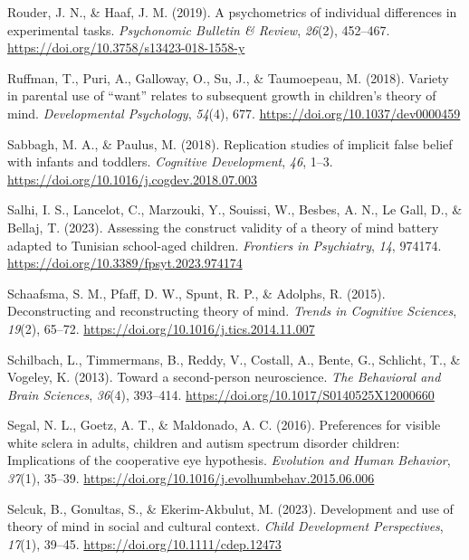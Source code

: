 \documentclass[
]{scrbook}
\newlength{\cslhangindent}
\newenvironment{CSLReferences}[2] %
 {\begin{list}{}{%
  \setlength{\itemindent}{0pt}
  \setlength{\leftmargin}{0pt}
  \setlength{\parsep}{0pt}
  \ifodd #1
   \setlength{\leftmargin}{\cslhangindent}
   \setlength{\itemindent}{-1\cslhangindent}
  \fi
  \setlength{\itemsep}{#2\baselineskip}}}
 {\end{list}}
\begin{document}
\begin{CSLReferences}{1}{0}
Rouder, J. N., \& Haaf, J. M. (2019). A psychometrics of individual differences in experimental tasks. \emph{Psychonomic Bulletin \& Review}, \emph{26}(2), 452--467. \url{https://doi.org/10.3758/s13423-018-1558-y}

Ruffman, T., Puri, A., Galloway, O., Su, J., \& Taumoepeau, M. (2018). Variety in parental use of {``want''} relates to subsequent growth in children's theory of mind. \emph{Developmental Psychology}, \emph{54}(4), 677. \url{https://doi.org/10.1037/dev0000459}

Sabbagh, M. A., \& Paulus, M. (2018). Replication studies of implicit false belief with infants and toddlers. \emph{Cognitive Development}, \emph{46}, 1--3. \url{https://doi.org/10.1016/j.cogdev.2018.07.003}

Salhi, I. S., Lancelot, C., Marzouki, Y., Souissi, W., Besbes, A. N., Le Gall, D., \& Bellaj, T. (2023). Assessing the construct validity of a theory of mind battery adapted to {Tunisian} school-aged children. \emph{Frontiers in Psychiatry}, \emph{14}, 974174. \url{https://doi.org/10.3389/fpsyt.2023.974174}

Schaafsma, S. M., Pfaff, D. W., Spunt, R. P., \& Adolphs, R. (2015). Deconstructing and reconstructing theory of mind. \emph{Trends in Cognitive Sciences}, \emph{19}(2), 65--72. \url{https://doi.org/10.1016/j.tics.2014.11.007}

Schilbach, L., Timmermans, B., Reddy, V., Costall, A., Bente, G., Schlicht, T., \& Vogeley, K. (2013). Toward a second-person neuroscience. \emph{The Behavioral and Brain Sciences}, \emph{36}(4), 393--414. \url{https://doi.org/10.1017/S0140525X12000660}

Segal, N. L., Goetz, A. T., \& Maldonado, A. C. (2016). Preferences for visible white sclera in adults, children and autism spectrum disorder children: Implications of the cooperative eye hypothesis. \emph{Evolution and Human Behavior}, \emph{37}(1), 35--39. \url{https://doi.org/10.1016/j.evolhumbehav.2015.06.006}

Selcuk, B., Gonultas, S., \& Ekerim-Akbulut, M. (2023). Development and use of theory of mind in social and cultural context. \emph{Child Development Perspectives}, \emph{17}(1), 39--45. \url{https://doi.org/10.1111/cdep.12473}


\end{CSLReferences}
\end{document}
